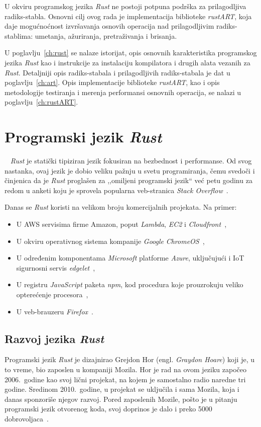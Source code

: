 \documentclass[12pt,oneside]{memoir}
\begin{document}
U okviru programskog jezika \textit{Rust} ne postoji potpuna podrška za
prilagodljiva radiks-stabla. Osnovni cilj ovog rada je implementacija
biblioteke \textit{rustART}, koja daje mogućnoćnost izvršavanja osnovih operacija
nad prilagodljivim radiks-stablima: umetanja, ažuriranja, pretraživanja i brisanja.

U poglavlju~\ref{ch:rust} se nalaze istorijat, opis
osnovnih karakteristika programskog jezika \textit{Rust} kao i instrukcije
za instalaciju kompilatora i drugih alata vezanih za \textit{Rust}.
Detaljniji opis radiks-stabala i
prilagodljivih radiks-stabala je dat u poglavlju~\ref{ch:art}.
Opis implementacije biblioteke \textit{rustART}, kao i opis metodologije
testiranja i merenja performansi osnovnih operacija,
se nalazi u poglavlju~\ref{ch:rustART}.

\chapter{Programski jezik \emph{Rust}}~\label{ch:rust}
\emph{Rust} je statički tipiziran jezik  fokusiran na bezbednost i
performanse. Od svog nastanka, ovaj jezik
je dobio veliku pažnju u svetu programiranja, čemu svedoči i činjenica da je
\emph{Rust} proglašen za ,,omiljeni programski jezik`` već petu godinu za redom
u anketi koju je sprovela popularna veb-stranica \emph{Stack Overflow}~\cite{mostloved_so}.

Danas se \emph{Rust} koristi na velikom broju komercijalnih projekata. Na primer:

\begin{itemize}
    \item U AWS servisima firme Amazon, poput \emph{Lambda}, \emph{EC2}
        i \emph{Cloudfront}~\cite{aws},
    \item U okviru operativnog sistema kompanije \textit{Google}
        \emph{ChromeOS}~\cite{crosvm},
    \item U određenim komponentama \textit{Microsoft} platforme \emph{Azure}, uključujući i
        IoT sigurnosni servis \emph{edgelet}~\cite{edgelet},
    \item U registru \emph{JavaScript} paketa \emph{npm},
        kod procedura koje prouzrokuju veliko opterećenje procesora~\cite{npm},
    \item U veb-brauzeru \textit{Firefox}~\cite{firefox_rust}.
\end{itemize}

\section{Razvoj jezika \emph{Rust}}
Programski jezik \emph{Rust} je dizajnirao Grejdon Hor
(engl. \emph{Graydon Hoare}) koji je, u to vreme, bio zaposlen u kompaniji
Mozila.
Hor je rad na ovom jeziku započeo 2006.\ godine kao svoj lični projekat,
na kojem je samostalno radio naredne tri godine.
Sredinom 2010.\ godine, u projekat se
uključila i sama Mozila, koja i danas sponzoriše njegov razvoj.
Pored zaposlenih Mozile, pošto je u pitanju programski jezik otvorenog koda,
svoj doprinos je dalo i preko 5000 dobrovoljaca~\cite{thanks_rust}.
\end{document}
